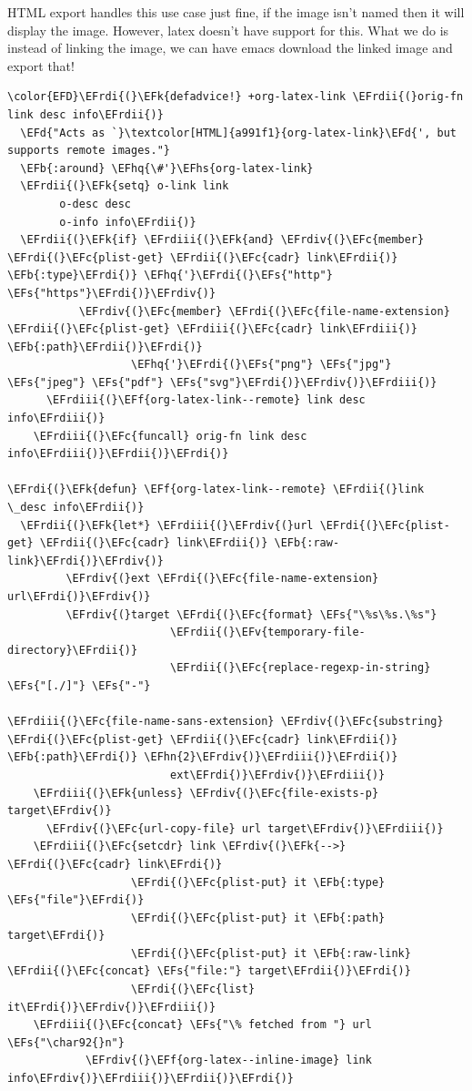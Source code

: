 \documentclass{scrartcl}
\newcommand{\EFk}[1]{\textcolor{EFk}{#1}} %
\newcommand{\EFd}[1]{\textcolor{EFd}{#1}} %
\newcommand{\EFs}[1]{\textcolor{EFs}{#1}} %
\newcommand{\EFb}[1]{\textcolor{EFb}{#1}} %
\newcommand{\EFc}[1]{\textcolor{EFc}{#1}} %
\newcommand{\EFv}[1]{\textcolor{EFv}{#1}} %
\newcommand{\EFf}[1]{\textcolor{EFf}{#1}} %
\newcommand{\EFhn}[1]{#1} %
\newcommand{\EFhq}[1]{#1} %
\newcommand{\EFhs}[1]{#1} %
\newcommand{\EFrdi}[1]{#1} %
\newcommand{\EFrdii}[1]{#1} %
\newcommand{\EFrdiii}[1]{#1} %
\newcommand{\EFrdiv}[1]{#1} %
\begin{document}
HTML export handles this use case just fine, if the image isn't named then it
will display the image. However, latex doesn't have support for this. What we do
is instead of linking the image, we can have emacs download the linked image and
export that!
\begin{Code}
\begin{Verbatim}[]
\color{EFD}\EFrdi{(}\EFk{defadvice!} +org-latex-link \EFrdii{(}orig-fn link desc info\EFrdii{)}
  \EFd{"Acts as `}\textcolor[HTML]{a991f1}{org-latex-link}\EFd{', but supports remote images."}
  \EFb{:around} \EFhq{\#'}\EFhs{org-latex-link}
  \EFrdii{(}\EFk{setq} o-link link
        o-desc desc
        o-info info\EFrdii{)}
  \EFrdii{(}\EFk{if} \EFrdiii{(}\EFk{and} \EFrdiv{(}\EFc{member} \EFrdi{(}\EFc{plist-get} \EFrdii{(}\EFc{cadr} link\EFrdii{)} \EFb{:type}\EFrdi{)} \EFhq{'}\EFrdi{(}\EFs{"http"} \EFs{"https"}\EFrdi{)}\EFrdiv{)}
           \EFrdiv{(}\EFc{member} \EFrdi{(}\EFc{file-name-extension} \EFrdii{(}\EFc{plist-get} \EFrdiii{(}\EFc{cadr} link\EFrdiii{)} \EFb{:path}\EFrdii{)}\EFrdi{)}
                   \EFhq{'}\EFrdi{(}\EFs{"png"} \EFs{"jpg"} \EFs{"jpeg"} \EFs{"pdf"} \EFs{"svg"}\EFrdi{)}\EFrdiv{)}\EFrdiii{)}
      \EFrdiii{(}\EFf{org-latex-link--remote} link desc info\EFrdiii{)}
    \EFrdiii{(}\EFc{funcall} orig-fn link desc info\EFrdiii{)}\EFrdii{)}\EFrdi{)}

\EFrdi{(}\EFk{defun} \EFf{org-latex-link--remote} \EFrdii{(}link \_desc info\EFrdii{)}
  \EFrdii{(}\EFk{let*} \EFrdiii{(}\EFrdiv{(}url \EFrdi{(}\EFc{plist-get} \EFrdii{(}\EFc{cadr} link\EFrdii{)} \EFb{:raw-link}\EFrdi{)}\EFrdiv{)}
         \EFrdiv{(}ext \EFrdi{(}\EFc{file-name-extension} url\EFrdi{)}\EFrdiv{)}
         \EFrdiv{(}target \EFrdi{(}\EFc{format} \EFs{"\%s\%s.\%s"}
                         \EFrdii{(}\EFv{temporary-file-directory}\EFrdii{)}
                         \EFrdii{(}\EFc{replace-regexp-in-string} \EFs{"[./]"} \EFs{"-"}
                                                   \EFrdiii{(}\EFc{file-name-sans-extension} \EFrdiv{(}\EFc{substring} \EFrdi{(}\EFc{plist-get} \EFrdii{(}\EFc{cadr} link\EFrdii{)} \EFb{:path}\EFrdi{)} \EFhn{2}\EFrdiv{)}\EFrdiii{)}\EFrdii{)}
                         ext\EFrdi{)}\EFrdiv{)}\EFrdiii{)}
    \EFrdiii{(}\EFk{unless} \EFrdiv{(}\EFc{file-exists-p} target\EFrdiv{)}
      \EFrdiv{(}\EFc{url-copy-file} url target\EFrdiv{)}\EFrdiii{)}
    \EFrdiii{(}\EFc{setcdr} link \EFrdiv{(}\EFk{-->} \EFrdi{(}\EFc{cadr} link\EFrdi{)}
                   \EFrdi{(}\EFc{plist-put} it \EFb{:type} \EFs{"file"}\EFrdi{)}
                   \EFrdi{(}\EFc{plist-put} it \EFb{:path} target\EFrdi{)}
                   \EFrdi{(}\EFc{plist-put} it \EFb{:raw-link} \EFrdii{(}\EFc{concat} \EFs{"file:"} target\EFrdii{)}\EFrdi{)}
                   \EFrdi{(}\EFc{list} it\EFrdi{)}\EFrdiv{)}\EFrdiii{)}
    \EFrdiii{(}\EFc{concat} \EFs{"\% fetched from "} url \EFs{"\char92{}n"}
            \EFrdiv{(}\EFf{org-latex--inline-image} link info\EFrdiv{)}\EFrdiii{)}\EFrdii{)}\EFrdi{)}
\end{Verbatim}
\end{Code}
\end{document}
